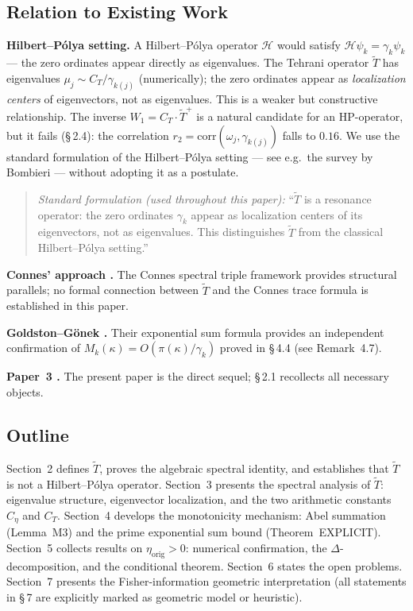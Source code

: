 \documentclass[11pt]{article}
\newcommand{\etaorig}{\eta_{\mathrm{orig}}}
\newcommand{\Tt}{\widetilde{T}}
\newcommand{\Ceta}{C_{\eta}}
\newcommand{\CT}{C_{T}}
\newcommand{\Wone}{W_1}
\begin{document}
\subsection{Relation to Existing Work}

\textbf{Hilbert--P\'olya setting.}
A Hilbert--P\'olya operator $\mathcal{H}$ would satisfy
$\mathcal{H}\psi_k = \gamma_k\psi_k$ ---
the zero ordinates appear directly as eigenvalues.
The Tehrani operator $\Tt$ has eigenvalues $\mu_j\sim\CT/\gamma_{k(j)}$
(numerically); the zero ordinates appear as \emph{localization centers}
of eigenvectors, not as eigenvalues.
This is a weaker but constructive relationship.
The inverse $\Wone = \CT\cdot\Tt^+$
is a natural candidate for an HP-operator,
but it fails (\S\,2.4): the correlation
$r_2 = \mathrm{corr}(\omega_j,\gamma_{k(j)})$ falls to $0.16$.
We use the standard formulation of the Hilbert--P\'olya setting
--- see e.g.\ the survey by Bombieri \cite{Bom00} ---
without adopting it as a postulate.

\begin{quote}
\textit{Standard formulation (used throughout this paper):}
``$\Tt$ is a resonance operator: the zero ordinates $\gamma_k$
appear as localization centers of its eigenvectors, not as eigenvalues.
This distinguishes $\Tt$ from the classical Hilbert--P\'olya setting.''
\end{quote}

\textbf{Connes' approach \cite{Con99}.}
The Connes spectral triple framework provides structural parallels;
no formal connection between $\Tt$ and the Connes trace formula is
established in this paper.

\textbf{Goldston--G\"onek \cite{GG05}.}
Their exponential sum formula provides an independent confirmation of
$M_k(\kappa) = O(\pi(\kappa)/\gamma_k)$ proved in \S\,4.4
(see Remark~4.7).

\textbf{Paper~3 \cite{Paper3}.}
The present paper is the direct sequel; \S\,2.1 recollects all necessary
objects.

\subsection{Outline}

Section~2 defines $\Tt$, proves the algebraic spectral identity,
and establishes that $\Tt$ is not a Hilbert--P\'olya operator.
Section~3 presents the spectral analysis of $\Tt$: eigenvalue structure,
eigenvector localization, and the two arithmetic constants
$\Ceta$ and $\CT$.
Section~4 develops the monotonicity mechanism: Abel summation (Lemma~M3)
and the prime exponential sum bound (Theorem~EXPLICIT).
Section~5 collects results on $\etaorig > 0$: numerical confirmation,
the $\Delta$-decomposition, and the conditional theorem.
Section~6 states the open problems.
Section~7 presents the Fisher-information geometric interpretation
(all statements in \S\,7 are explicitly marked as geometric model
or heuristic).
\end{document}
